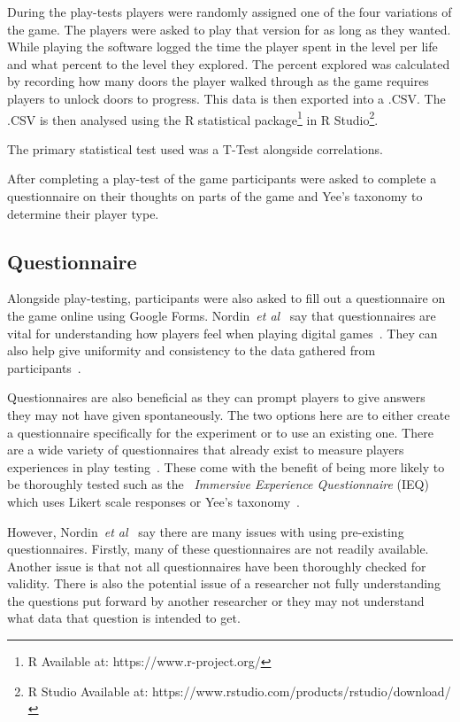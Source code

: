 \documentclass[journal]{IEEEtran}
\begin{document}
	During the play-tests players were randomly assigned one of the four variations of the game. The players were asked to play that version for as long as they wanted. While playing the software logged the time the player spent in the level per life and what percent to the level they explored. The percent explored was calculated by recording how many doors the player walked through as the game requires players to unlock doors to progress. This data is then exported into a .CSV. The .CSV is then analysed using the R statistical package\footnote[2]{R Available at: https://www.r-project.org/} in R Studio\footnote[3]{R Studio Available at: https://www.rstudio.com/products/rstudio/download/}.
	
	
	The primary statistical test used was a T-Test alongside correlations.
	
	After completing a play-test of the game participants were asked to complete a questionnaire on their thoughts on parts of the game and Yee's taxonomy to determine their player type.
	
	\subsection{Questionnaire} \label{Questionnaire}
	
	Alongside play-testing, participants were also asked to fill out a questionnaire on the game online using Google Forms. Nordin~\textit{et al}~\cite{nordin2014} say that questionnaires are vital for understanding how players feel when playing digital games~\cite{nordin2014,Denisova2016}. They can also help give uniformity and consistency to the data gathered from participants~\cite{Denisova2016}.
	
	Questionnaires are also beneficial as they can prompt players to give answers they may not have given spontaneously. The two options here are to either create a questionnaire specifically for the experiment or to use an existing one. There are a wide variety of questionnaires that already exist to measure players experiences in play testing~\cite{nordin2014, Jennett2008}. These come with the benefit of being more likely to be thoroughly tested such as the~\textit{ Immersive Experience Questionnaire} (IEQ) which uses Likert scale responses or Yee's taxonomy~\cite{nordin2014, Jennett2008, Yee2006, Yee2012}.
	
	However, Nordin~\textit{et al}~\cite{nordin2014} say there are many issues with using pre-existing questionnaires. Firstly, many of these questionnaires are not readily available. Another issue is that not all questionnaires have been thoroughly checked for validity. There is also the potential issue of a researcher not fully understanding the questions put forward by another researcher or they may not understand what data that question is intended to get.
	
\end{document}
